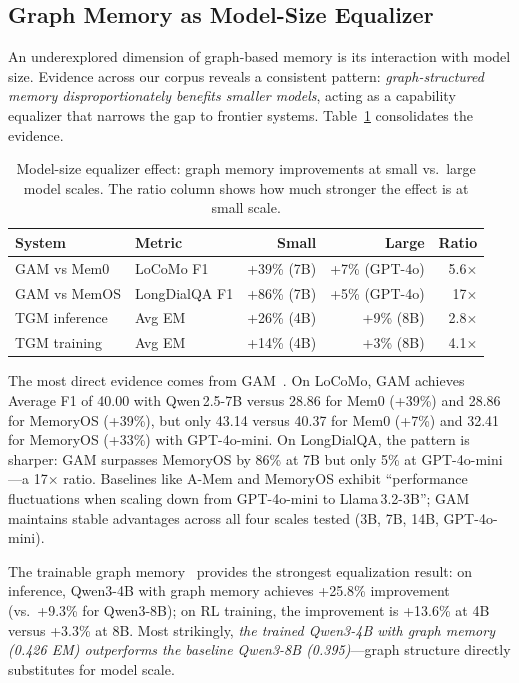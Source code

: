 \documentclass[hf]{ceurart}
\begin{document}
\subsection{Graph Memory as Model-Size Equalizer}
\label{sec:equalizer}

An underexplored dimension of graph-based memory is its interaction
with model size. Evidence across our corpus reveals a consistent
pattern: \emph{graph-structured memory disproportionately benefits
smaller models}, acting as a capability equalizer that narrows the
gap to frontier systems. Table~\ref{tab:equalizer} consolidates the
evidence.

\begin{table}[t]
\caption{Model-size equalizer effect: graph memory improvements at
  small vs.\ large model scales. The ratio column shows how much
  stronger the effect is at small scale.}
\label{tab:equalizer}
\centering\small
\begin{tabular}{@{}llrrr@{}}
\toprule
\textbf{System} & \textbf{Metric} & \textbf{Small} & \textbf{Large} & \textbf{Ratio} \\
\midrule
GAM vs Mem0 & LoCoMo F1 & +39\% \scriptsize(7B) & +7\% \scriptsize(GPT-4o) & 5.6$\times$ \\
GAM vs MemOS & LongDialQA F1 & +86\% \scriptsize(7B) & +5\% \scriptsize(GPT-4o) & 17$\times$ \\
TGM inference & Avg EM & +26\% \scriptsize(4B) & +9\% \scriptsize(8B) & 2.8$\times$ \\
TGM training & Avg EM & +14\% \scriptsize(4B) & +3\% \scriptsize(8B) & 4.1$\times$ \\
\bottomrule
\end{tabular}
\end{table}

The most direct evidence comes from GAM~\cite{gam2026}. On LoCoMo,
GAM achieves Average F1 of 40.00 with Qwen\,2.5-7B versus 28.86 for
Mem0 (+39\%) and 28.86 for MemoryOS (+39\%), but only 43.14 versus
40.37 for Mem0 (+7\%) and 32.41 for MemoryOS (+33\%) with GPT-4o-mini.
On LongDialQA, the pattern is sharper: GAM surpasses MemoryOS by 86\%
at 7B but only 5\% at GPT-4o-mini---a 17$\times$ ratio.
Baselines like A-Mem and MemoryOS exhibit ``performance fluctuations
when scaling down from GPT-4o-mini to Llama\,3.2-3B''; GAM maintains
stable advantages across all four scales tested (3B, 7B, 14B,
GPT-4o-mini).

The trainable graph memory~\cite{trainablegraph2025} provides the
strongest equalization result: on inference, Qwen3-4B with graph
memory achieves +25.8\% improvement (vs.\ +9.3\% for Qwen3-8B);
on RL training, the improvement is +13.6\% at 4B versus +3.3\% at
8B. Most strikingly, \emph{the trained Qwen3-4B with graph memory
(0.426 EM) outperforms the baseline Qwen3-8B (0.395)}---graph
structure directly substitutes for model scale.
\end{document}
